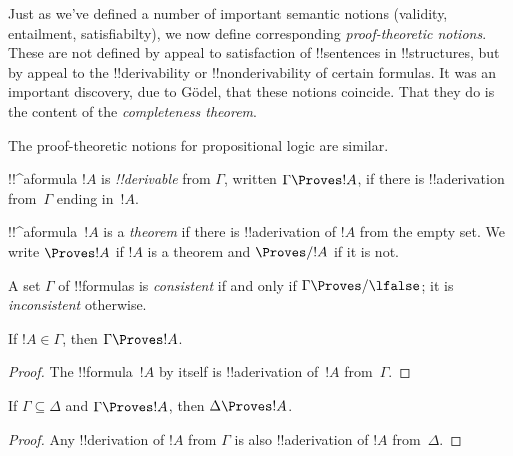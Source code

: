 \documentclass[../../../include/open-logic-section]{subfiles}
\begin{document}

\begin{explain}
Just as we've defined a number of important semantic notions
(validity, entailment, satisfiabilty), we now define corresponding
\emph{proof-theoretic notions}.  These are not defined by appeal to
satisfaction of !!{sentence}s in !!{structure}s, but by appeal to the
!!{derivability} or !!{nonderivability} of certain formulas.  It was
an important discovery, due to G\"odel, that these notions coincide.
That they do is the content of the \emph{completeness theorem}.

The proof-theoretic notions for propositional logic are similar.
\end{explain}

\begin{defn}[!!^{derivability}]
!!^a{formula} $!A$ is \emph{!!{derivable}} from $\Gamma$, written
$\Gamma \Proves !A$, if there is !!a{derivation} from~$\Gamma$ ending
in~$!A$.
\end{defn}

\begin{defn}[Theorems]
!!^a{formula}~$!A$ is a \emph{theorem} if there is !!a{derivation} of
$!A$ from the empty set.  We write $\Proves !A$ if $!A$ is a theorem
and $\Proves/ !A$ if it is not.
\end{defn}

\begin{defn}[Consistency]
A set $\Gamma$ of !!{formula}s is \emph{consistent} if and only if
$\Gamma\Proves/ \lfalse$; it is \emph{inconsistent} otherwise.
\end{defn}

\begin{prop}[Reflexivity]
If $!A \in \Gamma$, then $\Gamma \Proves !A$.
\end{prop}

\begin{proof}
  The !!{formula}~$!A$ by itself is !!a{derivation} of~$!A$ from~$\Gamma$.
\end{proof}

\begin{prop}[Monotony]
If $\Gamma \subseteq \Delta$ and $\Gamma \Proves !A$, then $\Delta
\Proves !A$.
\end{prop}

\begin{proof}
Any !!{derivation} of $!A$ from $\Gamma$ is also !!a{derivation} of
$!A$ from~$\Delta$.
\end{proof}
\end{document}
